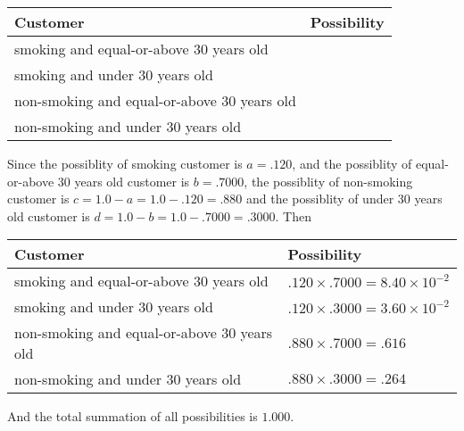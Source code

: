 \documentclass[12pt]{article}
\begin{document}
\noindent
\begin{tabular}{|l|l|}
\hline
Customer & Possibility \\
\hline
smoking  and   %
equal-or-above 30 years old  & \\
\hline
smoking  and   %
under 30 years old & \\
\hline
 non-smoking and   %
equal-or-above 30 years old  & \\
\hline
 non-smoking and  %
under 30 years old & \\
\hline
\end{tabular}
 
 
 
 
 
\noindent{}
 
 

Since the possiblity of  %
smoking customer is $ a =  %
.120 $,
and the possiblity of  %
equal-or-above 30 years old customer is $ b =  %
.7000 $,
the possiblity of  %
non-smoking customer is $ c = 1.0 - a = 1.0 -
.120
=  %
.880 $ and the possiblity of  %
under 30 years old
customer is $ d = 1.0 - b = 1.0 -  %
.7000 =  %
.3000  $.
Then
 
\noindent
\begin{tabular}{|l|l|}
\hline
Customer & Possibility \\
\hline
smoking  and  %
equal-or-above 30 years old  &
  $ %
.120 \times  %
.7000 =  %
8.40 \times 10^{-2}$ \\
\hline
smoking  and  %
under 30 years old &
  $ %
.120 \times  %
.3000 =  %
3.60 \times 10^{-2}$ \\
\hline
 non-smoking and  %
equal-or-above 30 years old  &
  $ %
.880 \times  %
.7000 =  %
.616$ \\
\hline
 non-smoking and  %
under 30 years old &
  $ %
.880 \times  %
.3000 =  %
.264$ \\
\hline
\end{tabular}
 
\noindent
And the total summation of all possibilities is $  %
1.000 $.
 
 
 
 
\noindent{}
 
 

 
 
 
\noindent{}
 
\end{document}
